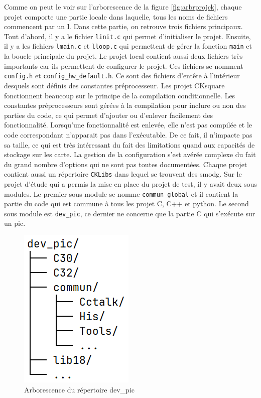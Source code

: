 \documentclass[a4paper]{article}
\begin{document}
Comme on peut le voir sur l'arborescence de la figure \ref{fig:arbrprojck},
chaque projet comporte une partie locale dans laquelle, tous les noms de
fichiers commencent par un \textbf{l}. Dans cette partie, on retrouve trois
fichiers principaux. Tout d'abord, il y a le fichier \verb|linit.c| qui permet
d'initialiser le projet. Ensuite, il y a les fichiers \verb|lmain.c| et
\verb|lloop.c| qui permettent de gérer la fonction \verb|main| et la boucle
principale du projet. Le projet local contient aussi deux fichiers très
importants car ils permettent de configurer le projet. Ces fichiers se nomment
\verb|config.h| et \verb|config_hw_default.h|. Ce sont des fichiers d'entête à
l'intérieur desquels sont définis des constantes préprocesseur. Les projet
CKsquare fonctionnent beaucoup sur le principe de la compilation conditionnelle.
Les constantes préprocesseurs sont gérées à la compilation pour inclure ou non
des parties du code, ce qui permet d'ajouter ou d'enlever facilement des
fonctionnalité. Lorsqu'une fonctionnalité est enlevée, elle n'est pas compilée
et le code correspondant n'apparait pas dans l'exécutable. De ce fait, il
n'impacte pas sa taille, ce qui est très intéressant du fait des limitations
quand aux capacités de stockage sur les carte. La gestion de la configuration
s'est avérée complexe du fait du grand nombre d'options qui ne sont pas toutes
documentées. Chaque projet contient aussi un répertoire \verb|CKLibs| dans
lequel se trouvent des \gls{smodg}. Sur le projet d'étude qui a permis la mise
en place du projet de test, il y avait deux sous modules. Le premier sous module
se nomme \verb|commun_global| et il contient la partie du code qui est commune à
tous les projet C, C++ et python. Le second sous module est \verb|dev_pic|, ce
dernier ne concerne que la partie C qui s'exécute sur un \gls{pic}.

\begin{figure}[h!]
  \begin{center}
    \includegraphics[scale=0.5]{./img/arborescence-devpic.png}
    \caption{Arborescence du répertoire dev\_pic}
    \label{fig:repdevpic}
  \end{center}
\end{figure}
\end{document}
